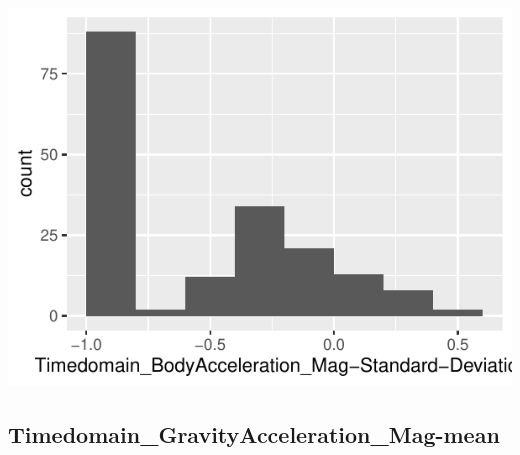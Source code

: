 \documentclass[
]{article}
\begin{document}
\begin{minipage}{0.25 \textwidth}

\includegraphics{codebook_tidydatasub_files/figure-latex/Var-34-Timedomain-BodyAcceleration-Mag-Standard-Deviation--1.pdf}

\end{minipage}

\noindent\makebox[\linewidth]{\rule{\textwidth}{0.4pt}}

\hypertarget{timedomain_gravityacceleration_mag-mean}{%
\subsection{Timedomain\_GravityAcceleration\_Mag-mean}\label{timedomain_gravityacceleration_mag-mean}}
\end{document}
